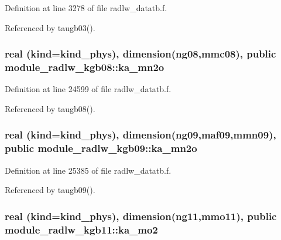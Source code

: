 Definition at line 3278 of file radlw\+\_\+datatb.\+f.



Referenced by taugb03().

\subsubsection[{\texorpdfstring{ka\+\_\+mn2o}{ka_mn2o}}]{\setlength{\rightskip}{0pt plus 5cm}real (kind=kind\+\_\+phys), dimension(ng08,mmc08), public module\+\_\+radlw\+\_\+kgb08\+::ka\+\_\+mn2o}\hypertarget{group__module__radlw__main_ga61949dc331e9a58d4f2a31b625481795}{}\label{group__module__radlw__main_ga61949dc331e9a58d4f2a31b625481795}


Definition at line 24599 of file radlw\+\_\+datatb.\+f.



Referenced by taugb08().

\subsubsection[{\texorpdfstring{ka\+\_\+mn2o}{ka_mn2o}}]{\setlength{\rightskip}{0pt plus 5cm}real (kind=kind\+\_\+phys), dimension(ng09,maf09,mmn09), public module\+\_\+radlw\+\_\+kgb09\+::ka\+\_\+mn2o}\hypertarget{group__module__radlw__main_ga37d98e8066c5995060a2a8451b45705f}{}\label{group__module__radlw__main_ga37d98e8066c5995060a2a8451b45705f}


Definition at line 25385 of file radlw\+\_\+datatb.\+f.



Referenced by taugb09().

\subsubsection[{\texorpdfstring{ka\+\_\+mo2}{ka_mo2}}]{\setlength{\rightskip}{0pt plus 5cm}real (kind=kind\+\_\+phys), dimension(ng11,mmo11), public module\+\_\+radlw\+\_\+kgb11\+::ka\+\_\+mo2}\hypertarget{group__module__radlw__main_ga8791eb290525c0d08fefa33ca23569c8}{}\label{group__module__radlw__main_ga8791eb290525c0d08fefa33ca23569c8}


